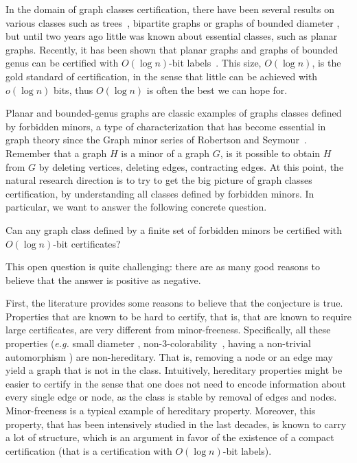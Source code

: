 \documentclass[a4paper,thm-restate,USenglish]{lipics-v2019}
\begin{document}
In the domain of graph classes certification, 
there have been several results on various classes such as trees~\cite{KormanKP10}, bipartite graphs \cite{GoosS16} or graphs of bounded diameter \cite{Censor-HillelPP20}, but until two years ago little was known about essential classes, such as planar graphs. 
Recently, it has been shown that planar graphs and graphs of bounded genus can be certified with $O(\log n)$-bit labels~\cite{FeuilloleyFMRRT20, FeuilloleyFMRRT21, EsperetL21}. 
This size, $O(\log n)$, is the gold standard of certification, in the sense that little can be achieved with $o(\log n)$ bits, thus $O(\log n)$ is often the best we can hope for.

Planar and bounded-genus graphs are classic examples of graphs classes defined by forbidden minors, a type of characterization that has become essential in graph theory since the Graph minor series of Robertson and Seymour~\cite{RobertsonS85}. 
Remember that a graph $H$ is a minor of a graph $G$, is it possible to obtain $H$ from $G$ by deleting vertices, deleting edges, contracting edges. 
At this point, the natural research direction is to try to get the big picture of graph classes  certification, by understanding all classes defined by forbidden minors. In particular, we want to answer the following concrete question.

\begin{question}
\label{conj:minorconj}
Can any graph class defined by a finite set of forbidden minors be certified with $O(\log n)$-bit certificates?
\end{question}

This open question is quite challenging: there are as many good reasons to believe that the answer is positive as negative.

First, the literature provides some reasons to believe that the conjecture is true. 
Properties that are known to be hard to certify, that is, that are known to require large certificates, are very different from minor-freeness. 
Specifically, all these properties (\emph{e.g.} small diameter \cite{Censor-HillelPP20}, non-3-colorability~\cite{GoosS16}, having a non-trivial automorphism \cite{GoosS16}) are non-hereditary. 
That is, removing a node or an edge may yield a graph that is not in the class. Intuitively, hereditary properties might be easier to certify in the sense that one does not need to encode information about every single edge or node, as the class is stable by removal of edges and nodes.  
Minor-freeness is a typical example of hereditary property. Moreover, this property, that has been intensively studied in the last decades, is known to carry a lot of structure, which is an argument in favor of the existence of a compact certification (that is a certification with $O(\log n)$-bit labels). 
\end{document}
